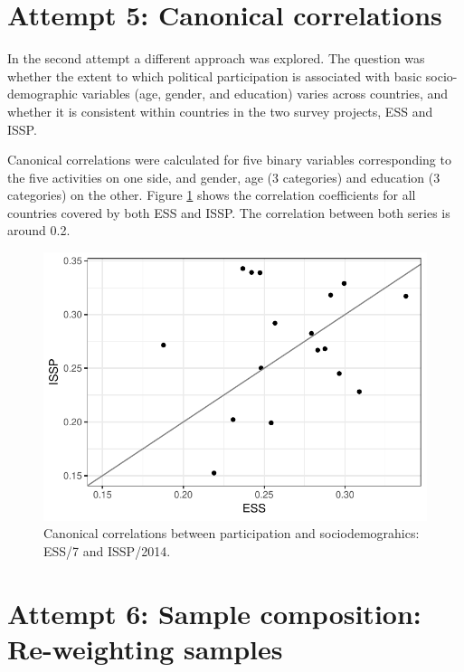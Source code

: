 \documentclass[12pt,]{article}
\begin{document}
\hypertarget{attempt-5-canonical-correlations}{%
\section{Attempt 5: Canonical correlations}\label{attempt-5-canonical-correlations}}

In the second attempt a different approach was explored. The question was whether the extent to which political participation is associated with basic socio-demographic variables (age, gender, and education) varies across countries, and whether it is consistent within countries in the two survey projects, ESS and ISSP.

Canonical correlations were calculated for five binary variables corresponding to the five activities on one side, and gender, age (3 categories) and education (3 categories) on the other. Figure \ref{fig:can-cor} shows the correlation coefficients for all countries covered by both ESS and ISSP. The correlation between both series is around 0.2.

\begin{figure}[H]

{\centering \includegraphics{report_files/figure-latex/can-cor-1} 

}

\caption{Canonical correlations between participation and sociodemograhics: ESS/7 and ISSP/2014.}\label{fig:can-cor}
\end{figure}

\hypertarget{attempt-6-sample-composition-re-weighting-samples}{%
\section{Attempt 6: Sample composition: Re-weighting samples}\label{attempt-6-sample-composition-re-weighting-samples}}
\end{document}

